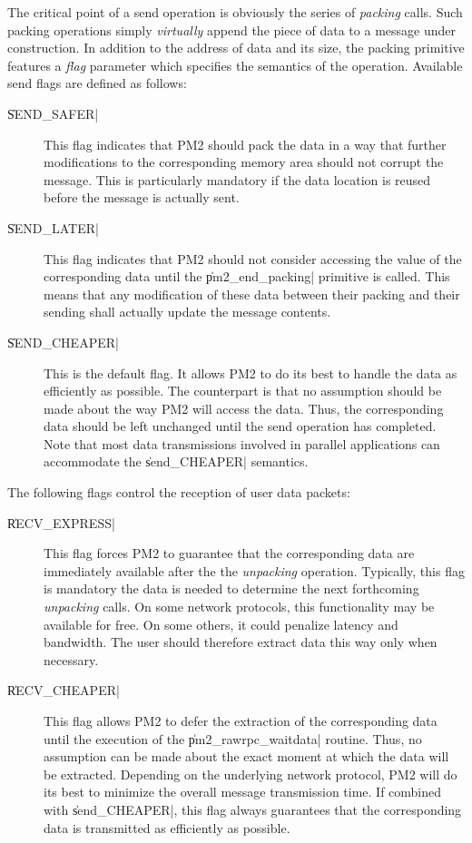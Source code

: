 The critical point of a send operation is obviously the series of
\emph{packing} calls. Such packing operations simply \emph{virtually}
append the piece of data to a message under construction. In addition
to the address of data and its size, the packing primitive features a
\emph{flag} parameter which specifies the semantics of the operation.
Available send flags are defined as follows:
\begin{description}
    
\item[\|SEND_SAFER|] This flag indicates that PM2 should pack the data
  in a way that further modifications to the corresponding memory area
  should not corrupt the message. This is particularly mandatory if
  the data location is reused before the message is actually sent.
  
\item[\|SEND_LATER|] This flag indicates that PM2 should not consider
  accessing the value of the corresponding data until the
  \|pm2_end_packing| primitive is called. This means that any
  modification of these data between their packing and their sending
  shall actually update the message contents.
    
\item[\|SEND_CHEAPER|] This is the default flag. It allows PM2 to do
  its best to handle the data as efficiently as possible. The
  counterpart is that no assumption should be made about the way PM2
  will access the data. Thus, the corresponding data should be left
  unchanged until the send operation has completed. Note that most
  data transmissions involved in parallel applications can accommodate
  the \|send_CHEAPER| semantics.

\end{description}
The following flags control the reception of user data packets:
\begin{description}
    
\item[\|RECV_EXPRESS|] This flag forces PM2 to guarantee that the
  corresponding data are immediately available after the the
  \emph{unpacking} operation. Typically, this flag is mandatory the
  data is needed to determine the next forthcoming \emph{unpacking}
  calls.  On some network protocols, this functionality may be
  available for free. On some others, it could penalize latency and
  bandwidth. The user should therefore extract data this way only when
  necessary.
    
\item[\|RECV_CHEAPER|] This flag allows PM2 to defer the extraction of
  the corresponding data until the execution of the
  \|pm2_rawrpc_waitdata| routine.  Thus, no assumption can be made
  about the exact moment at which the data will be extracted.
  Depending on the underlying network protocol, PM2 will do its best
  to minimize the overall message transmission time. If combined with
  \|send_CHEAPER|, this flag always guarantees that the corresponding
  data is transmitted as efficiently as possible.

\end{description}

